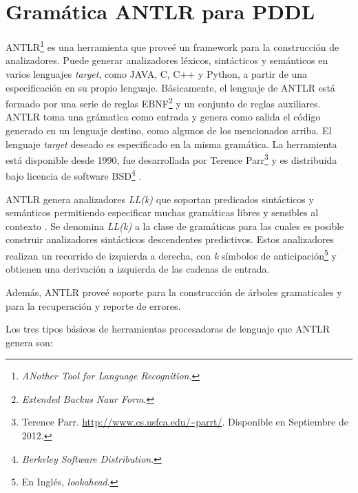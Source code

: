 \section{Gram\'atica ANTLR para PDDL} \label{cap4:sec2}


ANTLR\footnote{\emph{ANother Tool for Language Recognition}.}
es una herramienta que prove\'e un framework
para la construcci\'on de analizadores. Puede generar
analizadores l\'exicos, sint\'acticos y sem\'anticos en varios
lenguajes \emph{target}, como JAVA, C, C++ y Python, a partir
de una especificaci\'on en su propio lenguaje. B\'asicamente, el
lenguaje de ANTLR est\'a formado por una serie de reglas 
EBNF\footnote{\emph{Extended Backus Naur Form}.} \cite{gbraun:ebnf}
y un conjunto de reglas auxiliares. ANTLR toma una gr\'amatica como entrada y genera
como salida el c\'odigo generado en un lenguaje destino, como
algunos de los mencionados arriba. El lenguaje \emph{target} deseado es especificado en la 
misma gram\'atica. La herramienta est\'a disponible desde 1990, fue desarrollada 
por Terence Parr\footnote{Terence
  Parr. \url{http://www.cs.usfca.edu/~parrt/}. Disponible en
  Septiembre de 2012.} 
y es distribuida bajo licencia de software 
BSD\footnote{\emph{Berkeley Software Distribution}.} \cite{gbraun:bsd}.

ANTLR genera analizadores \emph{LL(k)} que soportan predicados sint\'acticos
y sem\'anticos permitiendo especificar muchas gram\'aticas libres y sensibles al
contexto \cite{gbraun:Chomsky1956}. Se denomina \emph{LL(k)} a la clase de
gram\'aticas para las cuales es posible construir analizadores
sint\'acticos descendentes predictivos. Estos analizadores realizan
un recorrido de izquierda a derecha, con \emph{k} s\'imbolos
de anticipaci\'on\footnote{En Ingl\'es, \emph{lookahead}.} y obtienen una
derivaci\'on a izquierda de las cadenas de entrada.

Adem\'as, ANTLR prove\'e soporte para la construcci\'on de \'arboles
gramaticales y para la recuperaci\'on y reporte de errores. 

Los tres tipos b\'asicos de herramientas procesadoras de lenguaje que 
ANTLR genera son:

